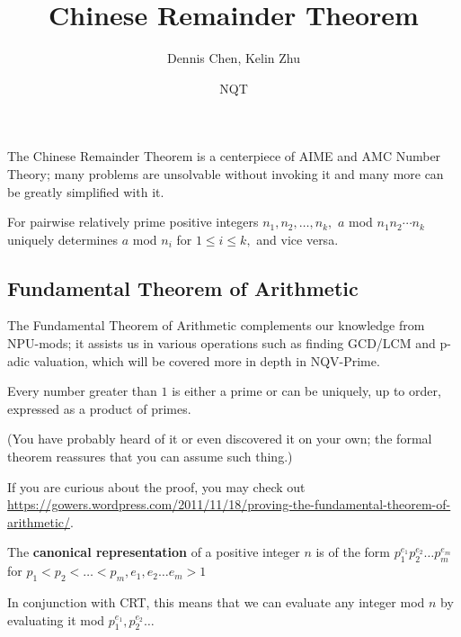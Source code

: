 \documentclass[mast]{lucky}
\title{Chinese Remainder Theorem}
\author{Dennis Chen, Kelin Zhu}
\date{NQT}
\begin{document}
\maketitle

The Chinese Remainder Theorem is a centerpiece of AIME and AMC Number Theory; many problems are unsolvable without invoking it and many more can be greatly simplified with it.

\begin{theo}
For pairwise relatively prime positive integers $n_1,n_2,\ldots,n_k,$ $a$ mod $n_1n_2\cdots n_k$ uniquely determines $a$ mod $n_i$ for $1\leq i\leq k,$ and vice versa.
\end{theo}

\subsection{Fundamental Theorem of Arithmetic}
The Fundamental Theorem of Arithmetic complements our knowledge from NPU-mods; it assists us in various operations such as finding GCD/LCM and p-adic valuation, which will be covered more in depth in NQV-Prime.
\begin{theo}
Every number greater than $1$ is either a prime or can be uniquely, up to order, expressed as a product of primes.

(You have probably heard of it or even discovered it on your own; the formal theorem reassures that you can assume such thing.)
\end{theo}

If you are curious about the proof, you may check out \url{https://gowers.wordpress.com/2011/11/18/proving-the-fundamental-theorem-of-arithmetic/}.

\begin{fact}
The \textbf{canonical representation} of a positive integer $n$ is of the form $p_1^{e_1}p_2^{e_2}\ldots p_m^{e_m}$ for $p_1<p_2<\ldots <p_m, e_1,e_2\ldots e_m>1$ 
\end{fact}

In conjunction with CRT, this means that we can evaluate any integer mod $n$ by evaluating it mod $p_1^{e_1},p_2^{e_2}\ldots$
\end{document}
